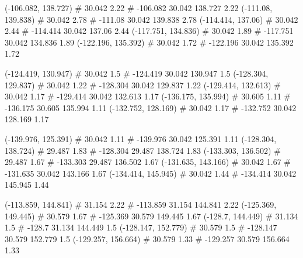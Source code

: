 \documentclass[a4paper,openbib,10pt]{article}
\newenvironment{treegraph}{\begin{graph}}{\end{graph}}
\begin{document}
\begin{treegraph}
  (-106.082, 138.727) #     30.042    2.22
   #    -106.082    30.042    138.727    2.22
  (-111.08, 139.838) #     30.042    2.78
   #    -111.08    30.042    139.838    2.78
  (-114.414, 137.06) #     30.042    2.44
   #    -114.414    30.042    137.06    2.44
  (-117.751, 134.836) #     30.042    1.89
   #    -117.751    30.042    134.836    1.89
  (-122.196, 135.392) #     30.042    1.72
   #    -122.196    30.042    135.392    1.72

  (-124.419, 130.947) #     30.042    1.5
   #    -124.419    30.042    130.947    1.5
  (-128.304, 129.837) #     30.042    1.22
   #    -128.304    30.042    129.837    1.22
  (-129.414, 132.613) #     30.042    1.17
   #    -129.414    30.042    132.613    1.17
  (-136.175, 135.994) #     30.605    1.11
   #    -136.175    30.605    135.994    1.11
  (-132.752, 128.169) #     30.042    1.17
   #    -132.752    30.042    128.169    1.17

  (-139.976, 125.391) #     30.042    1.11
   #    -139.976    30.042    125.391    1.11
  (-128.304, 138.724) #     29.487    1.83
   #    -128.304    29.487    138.724    1.83
  (-133.303, 136.502) #     29.487    1.67
   #    -133.303    29.487    136.502    1.67
  (-131.635, 143.166) #     30.042    1.67
   #    -131.635    30.042    143.166    1.67
  (-134.414, 145.945) #     30.042    1.44
   #    -134.414    30.042    145.945    1.44

  (-113.859, 144.841) #     31.154    2.22
   #    -113.859    31.154    144.841    2.22
  (-125.369, 149.445) #     30.579    1.67
   #    -125.369    30.579    149.445    1.67
  (-128.7, 144.449) #     31.134    1.5
   #    -128.7    31.134    144.449    1.5
  (-128.147, 152.779) #     30.579    1.5
   #    -128.147    30.579    152.779    1.5
  (-129.257, 156.664) #     30.579    1.33
   #    -129.257    30.579    156.664    1.33


\end{treegraph}
\end{document}
